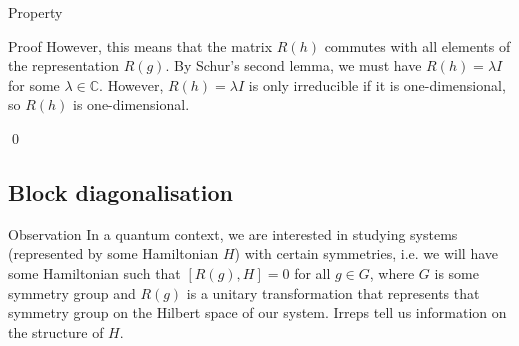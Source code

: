 \documentclass[a4paper]{article}
\begin{document}
\begin{parag}{Property}
\begin{subparag}{Proof}
        However, this means that the matrix $R\left(h\right)$ commutes with all elements of the representation $R\left(g\right)$. By Schur's second lemma, we must have $R\left(h\right) = \lambda I$ for some $\lambda \in \mathbb{C}$. However, $R\left(h\right) = \lambda I$ is only irreducible if it is one-dimensional, so $R\left(h\right)$ is one-dimensional.

        \qed
    \end{subparag}
\end{parag}

\subsection{Block diagonalisation}

\begin{parag}{Observation}
    In a quantum context, we are interested in studying systems (represented by some Hamiltonian $H$) with certain symmetries, i.e. we will have some Hamiltonian such that $\left[R\left(g\right), H\right] = 0$ for all $g \in G$, where $G$ is some symmetry group and $R\left(g\right)$ is a unitary transformation that represents that symmetry group on the Hilbert space of our system. Irreps tell us information on the structure of $H$.
\end{parag}
\end{document}

